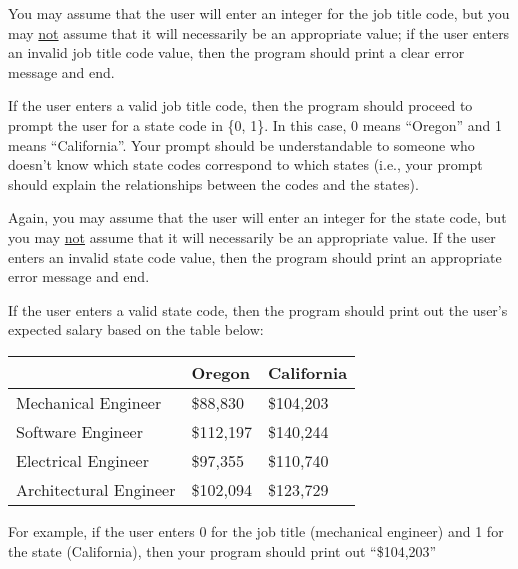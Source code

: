 \documentclass{article}
\begin{document}
You may assume that the user will enter an integer for the job title code, but you may \ul{not} assume that it will necessarily be an appropriate value; if the user enters an invalid job title code value, then the program should print a clear error message and end.

If the user enters a valid job title code, then the program should proceed to prompt the user for a state code in \{0, 1\}. In this case, 0 means ``Oregon'' and 1 means ``California''. Your prompt should be understandable to someone who doesn't know which state codes correspond to which states (i.e., your prompt should explain the relationships between the codes and the states).

Again, you may assume that the user will enter an integer for the state code, but you may \ul{not} assume that it will necessarily be an appropriate value. If the user enters an invalid state code value, then the program should print an appropriate error message and end.

If the user enters a valid state code, then the program should print out the user's expected salary based on the table below:

\begin{tabular}{|l|ll|}
        \hline
        & Oregon & California \\
        \hline
        Mechanical Engineer & \$88,830 & \$104,203 \\
        Software Engineer & \$112,197 & \$140,244 \\
        Electrical Engineer & \$97,355 & \$110,740 \\
        Architectural Engineer & \$102,094 & \$123,729 \\
        \hline
    \end{tabular}

For example, if the user enters 0 for the job title (mechanical engineer) and 1 for the state (California), then your program should print out ``\$104{,}203''

\clearpage
\end{document}
